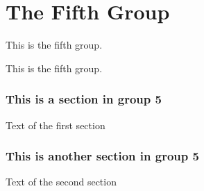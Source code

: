 \hypertarget{group__group5}{}\section{The Fifth Group}
\label{group__group5}


This is the fifth group.  


This is the fifth group. 

\hypertarget{mypage1}{}\subsubsection{This is a section in group 5}\label{mypage1}
Text of the first section \hypertarget{mypage2}{}\subsubsection{This is another section in group 5}\label{mypage2}
Text of the second section 